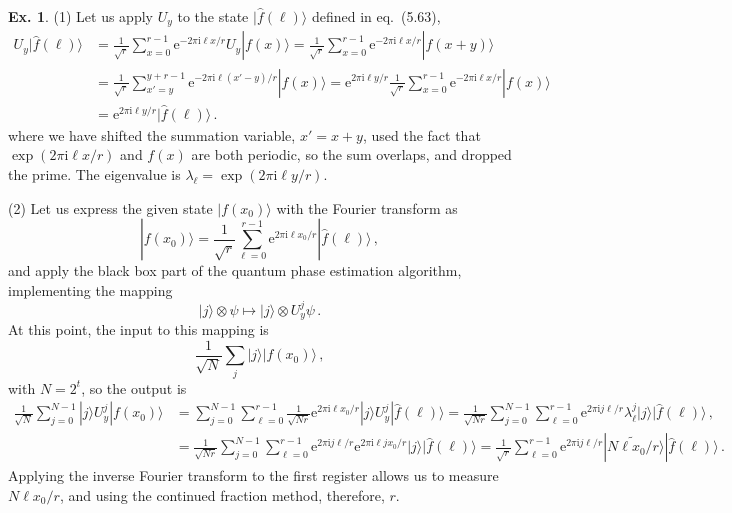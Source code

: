 \documentclass[a4paper,12pt]{article}
\def\e{\mathrm{e}}
\def\imagi{\mathrm{i}}
\theoremstyle{definition}
\newtheorem{exercise}{Ex.}[section]
\begin{document}
\begin{exercise}
 (1) Let us apply $U_y$ to the state $|\hat{f}(\ell)\rangle$ defined in eq.\ (5.63),
 \[
  \begin{aligned}
   U_y |\hat{f}(\ell)\rangle &= \frac{1}{\sqrt{r}}\sum_{x=0}^{r-1} \e^{-2\pi\imagi \ell x/r}U_y|f(x)\rangle = \frac{1}{\sqrt{r}}\sum_{x=0}^{r-1} \e^{-2\pi\imagi \ell x/r}|f(x+y)\rangle\\
   &= \frac{1}{\sqrt{r}}\sum_{x'=y}^{y+r-1}\e^{-2\pi\imagi \ell (x'-y)/r}|f(x)\rangle = \e^{2\pi\imagi \ell y/r}\frac{1}{\sqrt{r}}\sum_{x=0}^{r-1}\e^{-2\pi\imagi \ell x/r}|f(x)\rangle\\
   &= \e^{2\pi\imagi \ell y/r}|\hat{f}(\ell)\rangle\,.
  \end{aligned}
 \]
 where we have shifted the summation variable, $x'=x+y$, used the fact that $\exp(2\pi\imagi \ell x/r)$ and $f(x)$ are both periodic, so the sum overlaps, and dropped the prime. The eigenvalue is $\lambda_\ell = \exp(2\pi\imagi\ell y/r)$.
 
 (2) Let us express the given state $|f(x_0)\rangle$ with the Fourier transform as
 \[
  |f(x_0)\rangle = \frac{1}{\sqrt{r}}\sum_{\ell=0}^{r-1} \e^{2\pi\imagi \ell x_0/r}|\hat{f}(\ell)\rangle\,,
 \]
 and apply the black box part of the quantum phase estimation algorithm, implementing the mapping
 \[
  |j\rangle \otimes \psi \mapsto |j\rangle \otimes U_y^j \psi\,.
 \]
 At this point, the input to this mapping is
 \[
  \frac{1}{\sqrt{N}}\sum_j |j\rangle |f(x_0)\rangle\,,
 \]
 with $N=2^t$, so the output is
 \[
  \begin{aligned}
   \frac{1}{\sqrt{N}}\sum_{j=0}^{N-1} |j\rangle U_y^j|f(x_0)\rangle &= \sum_{j=0}^{N-1} \sum_{\ell=0}^{r-1} \frac{1}{\sqrt{Nr}} \e^{2\pi\imagi \ell x_0/r}|j\rangle U_y^j |\hat{f}(\ell)\rangle = \frac{1}{\sqrt{Nr}}\sum_{j=0}^{N-1}\sum_{\ell=0}^{r-1}\e^{2\pi\imagi j\ell/r}\lambda_\ell^j |j\rangle|\hat{f}(\ell)\rangle\,,\\
   &= \frac{1}{\sqrt{Nr}}\sum_{j=0}^{N-1}\sum_{\ell=0}^{r-1}\e^{2\pi\imagi j\ell/r}\e^{2\pi\imagi \ell j x_0/r}|j\rangle|\hat{f}(\ell)\rangle
   =\frac{1}{\sqrt{r}}\sum_{\ell=0}^{r-1}\e^{2\pi\imagi j\ell/r} |\widetilde{N\ell x_0/r}\rangle |\hat{f}(\ell)\rangle\,.
  \end{aligned}
 \]
 Applying the inverse Fourier transform to the first register allows us to measure $N\ell x_0/r$, and using the continued fraction method, therefore, $r$.
\end{exercise}
\end{document}
